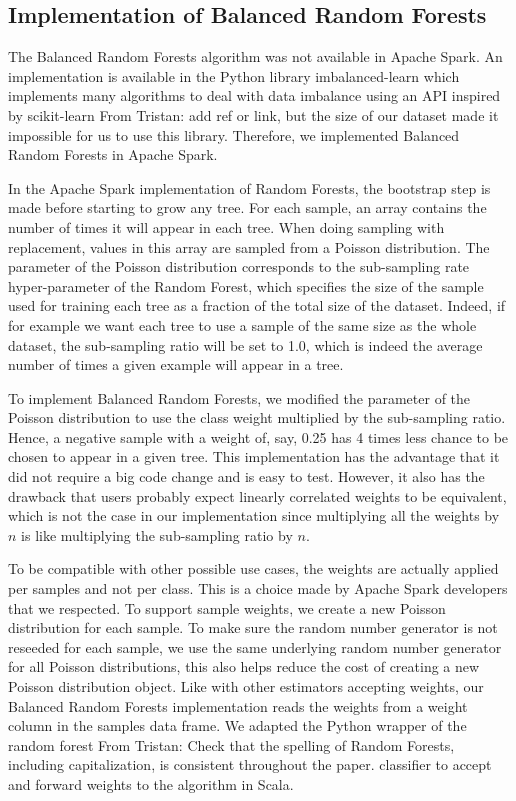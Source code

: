 \documentclass[conference]{IEEEtran}
\newcommand{\TG}[1]{\colorlet{saved}{.}\color{orange}From Tristan: #1\color{saved}}
\begin{document}
\subsection{Implementation of Balanced Random Forests}

The Balanced Random Forests algorithm was not available in Apache Spark.
An implementation is available in the Python library
imbalanced-learn\cite{imbalance} which implements many algorithms to deal
with data imbalance using an API inspired by scikit-learn \TG{add ref or link}, but the size of
our dataset made it impossible for us to use this library. Therefore, we
implemented Balanced Random Forests in Apache Spark.

In the Apache Spark implementation of Random Forests, the bootstrap step is
made before starting to grow any tree. For each sample, an array contains
the number of times it will appear in each tree. When doing sampling with
replacement, values in this array are sampled from a Poisson distribution.
The parameter of the Poisson distribution corresponds to the sub-sampling
rate hyper-parameter of the Random Forest, which specifies the size of the
sample used for training each tree as a fraction of the total size of the
dataset. Indeed, if for example we want each tree to use a sample of the
same size as the whole dataset, the sub-sampling ratio will be set to 1.0,
which is indeed the average number of times a given example will appear in a tree.

To implement Balanced Random Forests, we modified the parameter of
the Poisson distribution to use the class weight multiplied by the
sub-sampling ratio. Hence, a negative sample with a weight
of, say, 0.25 has 4 times less chance to be chosen to appear in a given tree. This
implementation has the advantage that it did not require a big code change
and is easy to test. However, it also has the drawback that users probably
expect linearly correlated weights to be equivalent, which is not the case
in our implementation since multiplying all the weights by $n$ is like multiplying
the sub-sampling ratio by $n$.

To be compatible with other possible use cases, the weights are
actually applied per samples and not per class. This is a choice made by
Apache Spark developers that we respected. To support sample
weights, we create a new Poisson distribution for each sample. To make sure
the random number generator is not reseeded for each sample, we use the
same underlying random number generator for all Poisson distributions, this
also helps reduce the cost of creating a new Poisson distribution object.
Like with other estimators accepting weights, our Balanced Random Forests
implementation reads the weights from a weight column in the samples data frame.
We adapted the Python wrapper of the random forest \TG{Check that the spelling of Random Forests, including capitalization, is consistent throughout the paper.} classifier to accept and
forward weights to the algorithm in Scala.
\end{document}
